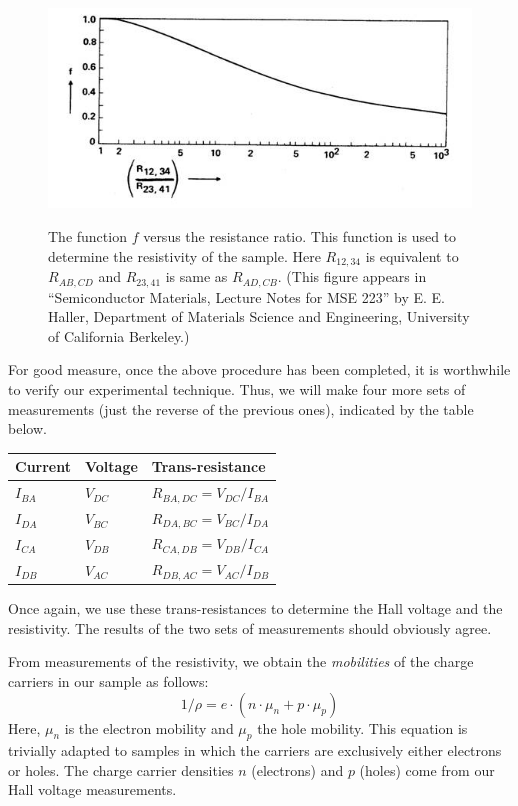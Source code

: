 \documentclass{../lab}
\begin{document}
\begin{figure}[h]
    \centering
    \href{http://experimentationlab.berkeley.edu/sites/default/files/images/SHE76image003.jpg}{\includegraphics[width=0.7\linewidth]{images/SHE76image003.jpg}}
    \caption{The function $f$ versus the resistance ratio. This function is used to determine the resistivity of the sample. Here $R_{12,34}$ is equivalent to $R_{AB,CD}$ and $R_{23,41}$ is same as $R_{AD,CB}$. (This figure appears in ``Semiconductor Materials, Lecture Notes for MSE 223'' by E. E. Haller, Department of Materials Science and Engineering, University of California Berkeley.)}
    \label{fig:FVersusResistanceRatio}
\end{figure}

For good measure, once the above procedure has been completed, it is worthwhile to verify our experimental technique. Thus, we will make four more sets of measurements (just the reverse of the previous ones), indicated by the table below.

\begin{center}
    \begin{tabular}{l|l|l}
        Current  & Voltage  & Trans-resistance \\\hline
        $I_{BA}$ & $V_{DC}$ & $R_{BA,DC} = V_{DC} / I_{BA}$ \\\hline
        $I_{DA}$ & $V_{BC}$ & $R_{DA,BC} = V_{BC} / I_{DA}$ \\\hline
        $I_{CA}$ & $V_{DB}$ & $R_{CA,DB} = V_{DB} / I_{CA}$ \\\hline
        $I_{DB}$ & $V_{AC}$ & $R_{DB,AC} = V_{AC} / I_{DB}$
    \end{tabular}
\end{center}

Once again, we use these trans-resistances to determine the Hall voltage and the resistivity. The results of the two sets of measurements should obviously agree.

From measurements of the resistivity, we obtain the \emph{mobilities} of the charge carriers in our sample as follows:
\begin{equation}
    1/\rho = e \cdot (n\cdot\mu_n + p\cdot\mu_p)
\end{equation}
Here, $\mu_n$ is the electron mobility and $\mu_p$ the hole mobility. This equation is trivially adapted to samples in which the carriers are exclusively either electrons or holes. The charge carrier densities $n$ (electrons) and $p$ (holes) come from our Hall voltage measurements.
\end{document}

